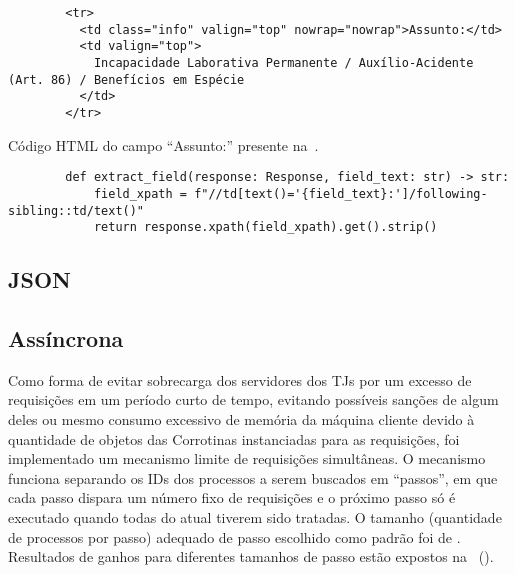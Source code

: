 \begin{listing}
    \centering{}
    \begin{verbatim}
        <tr>
          <td class="info" valign="top" nowrap="nowrap">Assunto:</td>
          <td valign="top">
            Incapacidade Laborativa Permanente / Auxílio-Acidente (Art. 86) / Benefícios em Espécie
          </td>
        </tr>
    \end{verbatim}
    \caption{Código HTML do campo ``Assunto:'' presente na~.}
    \label{cod:html-assunto}
\end{listing}

\begin{listing}[htb]
    \centering{}
    \begin{verbatim}
        def extract_field(response: Response, field_text: str) -> str:
            field_xpath = f"//td[text()='{field_text}:']/following-sibling::td/text()"
            return response.xpath(field_xpath).get().strip()
    \end{verbatim}
    \caption{%
        Código da função responsável pela extração de um campo em uma resposta
        de uma requisição a uma página de visualização de processo.
    }
    \label{cod:extract_field}
\end{listing}


\subsection{JSON}


\subsection{Assíncrona}


Como forma de evitar sobrecarga dos servidores dos TJs por um excesso de
requisições em um período curto de tempo, evitando possíveis sanções de algum
deles ou mesmo consumo excessivo de memória da máquina cliente devido à
quantidade de objetos das Corrotinas instanciadas para as requisições, foi
implementado um mecanismo limite de requisições simultâneas. O mecanismo
funciona separando os IDs dos processos a serem buscados em ``passos'', em que
cada passo dispara um número fixo de requisições e o próximo passo só é
executado quando todas do atual tiverem sido tratadas. O tamanho (quantidade de
processos por passo) adequado de passo escolhido como padrão foi de
. Resultados de ganhos para diferentes tamanhos de passo estão
expostos na~
().

